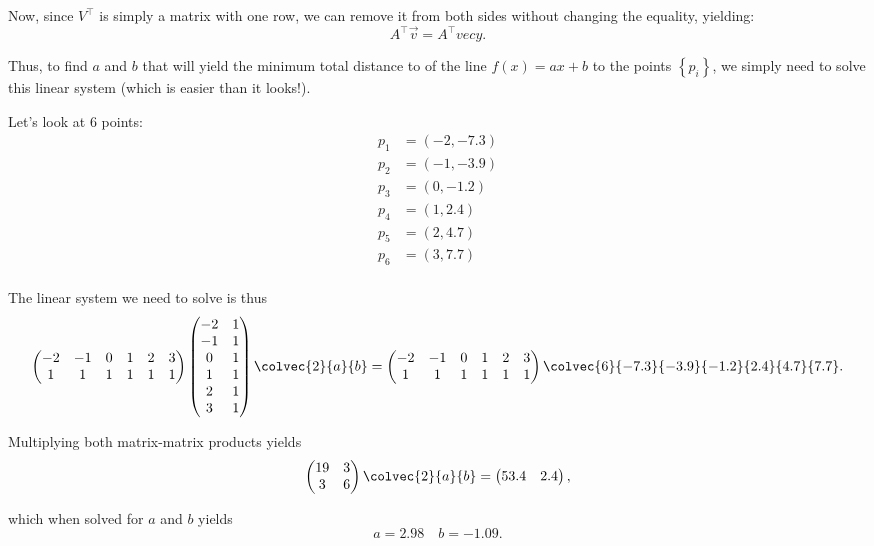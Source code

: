 Now, since $V^{\top}$ is simply a matrix with one row, we can remove it from both sides without changing the equality, yielding:
\begin{equation*}
  A^{\top}\vec{v} = A^{\top}vec{y}.
\end{equation*}

Thus, to find $a$ and $b$ that will yield the minimum total distance to of the line $f(x)=ax+b$ to the points $\left\{ p_{i} \right\}$, we simply need to solve this linear system (which is easier than it looks!).

\begin{example}
  Let's look at 6 points:
  \begin{align*}
    p_{1} &= \left( -2, -7.3 \right)\\
    p_{2} &= \left( -1, -3.9 \right)\\
    p_{3} &= \left( 0, -1.2 \right)\\
    p_{4} &= \left( 1, 2.4 \right)\\
    p_{5} &= \left( 2, 4.7 \right)\\
    p_{6} &= \left( 3, 7.7 \right)\\
  \end{align*}

  The linear system we need to solve is thus
  \begin{equation*}
    \begin{pmatrix} -2 & -1 & 0 & 1 & 2 & 3 \\ 1 & 1 & 1 & 1 & 1 & 1 \end{pmatrix}\begin{pmatrix} -2 & 1 \\ -1 & 1 \\0 & 1 \\1 & 1 \\2 & 1 \\3 & 1 \end{pmatrix} \colvec{2}{a}{b} = \begin{pmatrix} -2 & -1 & 0 & 1 & 2 & 3 \\ 1 & 1 & 1 & 1 & 1 & 1 \end{pmatrix} \colvec{6}{-7.3}{-3.9}{-1.2}{2.4}{4.7}{7.7}.
  \end{equation*}

  Multiplying both matrix-matrix products yields
  \begin{equation*}
    \begin{pmatrix} 19 & 3 \\ 3 & 6 \end{pmatrix} \colvec{2}{a}{b} = \begin{pmatrix} 53.4 & 2.4 \end{pmatrix},
  \end{equation*}

  which when solved for $a$ and $b$ yields
  \begin{equation*}
    a = 2.98\quad b=-1.09.
  \end{equation*}
\end{example}

